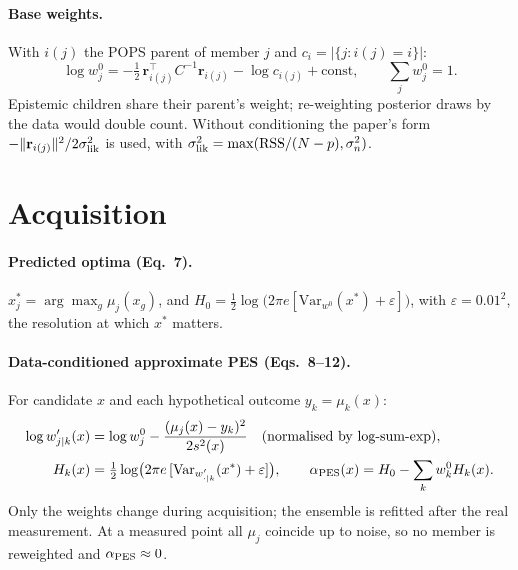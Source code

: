 \documentclass[11pt,a4paper]{article}
\newcommand{\Var}{\mathrm{Var}}
\newcommand{\br}{\mathbf{r}}
\begin{document}
\paragraph{Base weights.} With $i(j)$ the POPS parent of member $j$ and $c_i = |\{j: i(j)=i\}|$:
\begin{equation}
\log w^0_j = -\tfrac12\,\br_{i(j)}^\top C^{-1}\br_{i(j)} - \log c_{i(j)} + \text{const},\qquad \textstyle\sum_j w^0_j = 1 .
\end{equation}
Epistemic children share their parent's weight; re-weighting posterior draws by the data would double count.
Without conditioning the paper's form $-\|\br_{i(j)}\|^2/2\sigma^2_{\rm lik}$ is used, with $\sigma^2_{\rm lik} = \max(\mathrm{RSS}/(N-p),\sigma_n^2)$.

\section{Acquisition}
\paragraph{Predicted optima (Eq.~7).} $x^*_j = \arg\max_g \mu_j(x_g)$, and $H_0 = \tfrac12\log\bigl(2\pi e[\Var_{w^0}(x^*)+\varepsilon]\bigr)$,
with $\varepsilon = 0.01^2$, the resolution at which $x^*$ matters.

\paragraph{Data-conditioned approximate PES (Eqs.~8--12).} For candidate $x$ and each hypothetical outcome $y_k = \mu_k(x)$:
\begin{align}
\log w'_{j\mid k}(x) &= \log w^0_j - \frac{(\mu_j(x)-y_k)^2}{2s^2(x)}\quad\text{(normalised by log-sum-exp)},\\
H_k(x) &= \tfrac12\log\bigl(2\pi e\,[\Var_{w'_{\cdot\mid k}}(x^*)+\varepsilon]\bigr),\qquad
\alpha_{\rm PES}(x) = H_0 - \sum_k w^0_k H_k(x).
\end{align}
Only the weights change during acquisition; the ensemble is refitted after the real measurement. At a measured point all
$\mu_j$ coincide up to noise, so no member is reweighted and $\alpha_{\rm PES}\approx 0$.
\end{document}
